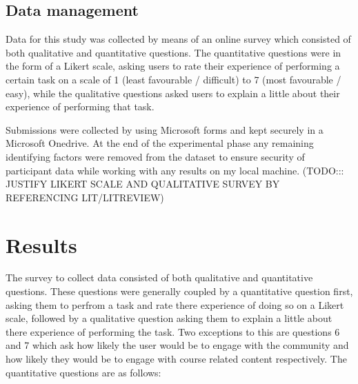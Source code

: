 \documentclass[lettersize,journal]{IEEEtran}
\begin{document}
	\subsection{Data management}
		Data for this study was collected by means of an online survey which consisted of both qualitative and quantitative questions. The quantitative
		questions were in the form of a Likert scale, asking users to rate their experience of performing a certain task on a scale of 1 (least favourable
		/ difficult) to 7 (most favourable / easy), while the qualitative questions asked users to explain a little about their experience of performing
		 that task.

		Submissions were collected by using Microsoft forms and kept securely in a Microsoft Onedrive. At the end of the experimental phase any remaining
		identifying factors were removed from the dataset to ensure security of participant data while working with any results on my local machine.
		(TODO::: JUSTIFY LIKERT SCALE AND QUALITATIVE SURVEY BY REFERENCING LIT/LITREVIEW)

\section{Results}

 The survey to collect data consisted of both qualitative and quantitative questions. These questions were generally coupled by a quantitative question first, asking them to perfrom a task and 
 rate there experience of doing so on a Likert scale, followed by a qualitative question asking them to explain a little about there experience of performing the task. Two exceptions to this are questions
 6 and 7 which ask how likely the user would be to engage with the community and how likely they would be to engage with course related content respectively. The quantitative questions
 are as follows:
\end{document}

